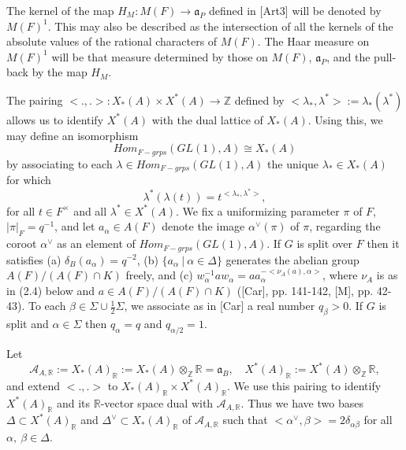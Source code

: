 \documentclass[12pt]{article}
\begin{document}
The kernel of the map $H_M:M(F)\rightarrow\mathfrak{a}_P$ defined in [Art3] will be denoted by $M(F)^1$. This may also be described as the intersection of all the kernels of the absolute values of the rational characters of $M(F)$. The Haar measure on $M(F)^1$ will be that measure determined by those on $M(F)$, $\mathfrak{a}_P$, and the pull-back by the map $H_M$.

The pairing $<.,.>:X_*(A)\times X^*(A)\rightarrow\mathbb{Z}$ defined by $<\lambda_*,\lambda^*>:=\lambda_*(\lambda^*)$ allows us to identify $X^*(A)$ with the dual lattice of $X_*(A)$. Using this, we may define an isomorphism
\begin{equation}\tag{2.3}
Hom_{F-grps}(GL(1),A)\cong X_*(A)
\end{equation}
by associating to each $\lambda\in Hom_{F-grps}(GL(1),A)$ the unique $\lambda_*\in X_*(A)$ for which
\[
\lambda^*(\lambda(t))=t^{<\lambda_*,\lambda^*>},
\]
for all $t\in F^\times$ and all $\lambda^*\in X^*(A)$. We fix a uniformizing parameter $\pi$ of $F$, $|\pi|_F=q^{-1}$, and let $a_\alpha\in A(F)$ denote the image $\alpha^\vee(\pi)$ of $\pi$, regarding the coroot $\alpha^\vee$ as an element of $Hom_{F-grps}(GL(1),A)$. If $G$ is split over $F$ then it satisfies (a) $\delta_B(a_\alpha)=q^{-2}$, (b) $\{a_\alpha\ |\ \alpha\in\Delta\}$ generates the abelian group $A(F)/(A(F)\cap K)$ freely, and (c) $w_\alpha^{-1}aw_\alpha=aa_\alpha^{-<\nu_A(a),\alpha>}$, where $\nu_A$ is as in (2.4) below and $a\in A(F)/(A(F)\cap K)$ ([Car], pp. 141-142, [M], pp. 42-43). To each $\beta\in\Sigma\cup\frac{1}{2}\Sigma$, we associate as in [Car] a real number $q_\beta>0$. If $G$ is split and $\alpha\in\Sigma$ then $q_\alpha=q$ and $q_{\alpha/2}=1$.

Let
\[
\mathcal{A}_{A,\mathbb{R}}:=X_*(A)_{\mathbb{R}}:=X_*(A)\otimes_{\mathbb{Z}}\mathbb{R}=\mathfrak{a}_B,\quad X^*(A)_{\mathbb{R}}:=X^*(A)\otimes_{\mathbb{Z}}\mathbb{R},
\]
and extend $<.,.>$ to $X_*(A)_{\mathbb{R}}\times X^*(A)_{\mathbb{R}}$. We use this pairing to identify $X^*(A)_{\mathbb{R}}$ and its $\mathbb{R}$-vector space dual with $\mathcal{A}_{A,\mathbb{R}}$. Thus we have two bases $\Delta\subset X^*(A)_{\mathbb{R}}$ and $\Delta^\vee\subset X_*(A)_{\mathbb{R}}$ of $\mathcal{A}_{A,\mathbb{R}}$ such that $<\alpha^\vee,\beta>=2\delta_{\alpha\beta}$ for all $\alpha,\ \beta\in\Delta$.
\end{document}
